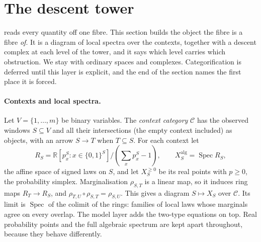 \documentclass[11pt]{article}
\theoremstyle{definition}\newtheorem{definition}{Definition}\newtheorem{remark}{Remark}
\begin{document}
\section{The descent tower}\label{sec:descent}
 reads every quantity off one fibre. This section builds the object the fibre is a fibre \emph{of}. It is a diagram of local
spectra over the contexts, together with a descent complex at each level of the tower, and it says which level carries which
obstruction. We stay with ordinary spaces and complexes. Categorification is deferred until this layer is explicit, and the end of the
section names the first place it is forced.

\paragraph{Contexts and local spectra.} Let $V=\{1,\dots,m\}$ be binary variables. The \emph{context category} $\mathcal C$ has the
observed windows $S\subseteq V$ and all their intersections (the empty context included) as objects, with an arrow $S\to T$ when
$T\subseteq S$. For each context let
\[
R_S=\mathbb R[p^S_x:x\in\{0,1\}^S]/(\textstyle\sum_xp^S_x-1),\qquad X_S^{\mathrm{alg}}=\operatorname{Spec}R_S,
\]
the affine space of signed laws on $S$, and let $X_S^{\ge0}$ be its real points with $p\ge0$, the probability simplex.
Marginalisation $\rho_{S,T}$ is a linear map, so it induces ring maps $R_T\to R_S$, and $\rho_{T,U}\circ\rho_{S,T}=\rho_{S,U}$. This
gives a diagram $S\mapsto X_S$ over $\mathcal C$. Its limit is $\operatorname{Spec}$ of the colimit of the rings: families of local
laws whose marginals agree on every overlap. The model layer adds the two-type equations on top. Real probability points and the full
algebraic spectrum are kept apart throughout, because they behave differently.
\end{document}
